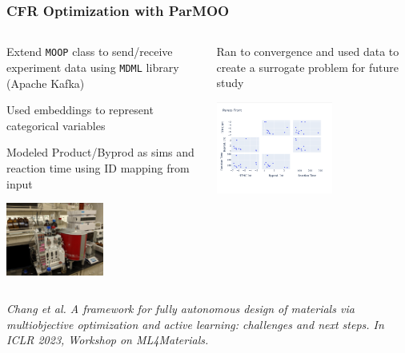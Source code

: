 \documentclass[aspectratio=169]{beamer}
\begin{document}
\begin{frame}\frametitle{CFR Optimization with ParMOO}

\begin{columns}
\begin{column}{0.5\textwidth}

\medskip
Extend {\tt MOOP} class to send/receive experiment data
using {\tt MDML} library (Apache Kafka)

\medskip
Used embeddings to represent
categorical variables

\medskip
Modeled Product/Byprod as sims and reaction time using ID
mapping from input

\begin{center}
\includegraphics[width=0.5\textwidth]{../img/probs/cfr-nmr-setup.jpg}\\
\end{center}
\end{column}
\begin{column}{0.5\textwidth}
\begin{center}
Ran to convergence and used data to create a surrogate problem
for future study\\

\bigskip

\includegraphics[width=0.6\textwidth]{../img/moo_new/cfr_pareto_front.png}\\
\end{center}
\end{column}
\end{columns}

\vfill

{\tiny\it
Chang et al.
A framework for fully autonomous design of materials via multiobjective optimization and active learning: challenges and next steps.
In {\sl ICLR 2023, Workshop on ML4Materials}.\\
}

\end{frame}
\end{document}

